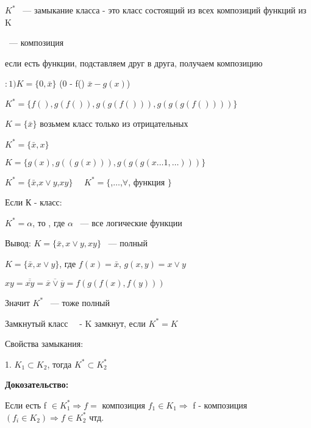 \documentclass[russian]{lecture-notes}
\begin{document}
			$K^{*}$ ~--- замыкание класса - это класс состоящий из всех композиций функций из K


			 ~--- композиция

			если есть функции, подставляем друг в друга, получаем композицию

	\begin{example}
		$:1) K = \{0,\bar{x}\}$ \quad (0 - f() $\bar{x} - g(x)$)

		$K^{*} = \{ f(), g(f()), g(g(f())), g(g(g(f())))\}$
\end{example}
	\begin{example}
		$K = \{\bar{x}\}$ возьмем класс только из отрицательных

		$K^{*} = \{ \bar{x}, x\}$

		$K = \{ g(x), g((g(x))), g(g(g(x \dots 1, \dots )))\}$
\end{example}
	\begin{example}
		$K^{*}=\{ \bar{x}$,$ x \lor y$,$ xy \}$  $\quad K^{*} = \{ $,$ \dots$,$ \forall$, функция $\}$
	\end{example}

	\begin{definition}

		Если К - класс:

		$K^{*} = \alpha$, то , где $\alpha$ ~--- все логические функции

		Вывод: $K = \{ \bar{x}, x \lor y, xy\}$ ~--- полный

		\end{definition}
		\begin{example}

			$K = \{\bar{x}, x \lor y \}$, где $f(x) = \bar{x}$, $g(x, y) = x \lor y$
		\end{example}
		
		$xy = \overline{\overline{xy}} = \overline{\overline{x} \lor \overline{y}}
		 = f(g(f(x),f(y)))$  %

		Значит $K^{*}$ ~--- тоже полный

	\begin{definition}
		Замкнутый класс ~~- K замкнут, если $K^{*} = K$
		\end{definition}

	Свойства замыкания:

	1. $K_{1} \subset K_{2}$, тогда $K^{*} \subset K_{2}^{*}$

	\textbf{Докозательство:}

		Если есть f $\in K_{1}^{*} \Rightarrow f = $ композиция $f_{1} \in K_{1} \Rightarrow$
	f - композиция $(f_{i} \in K_{2}) \Rightarrow f \in K_{2}^{*} $ чтд.
\end{document}
